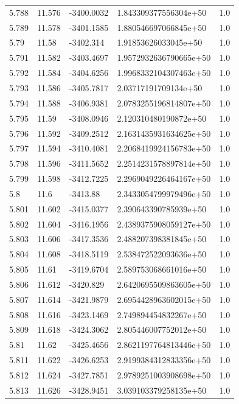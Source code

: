 \begin{tabular}{lllll}
5.788 & 11.576 & -3400.0032 & 1.843309377556304e+50 & 1.0 \\
5.789 & 11.578 & -3401.1585 & 1.880546697066845e+50 & 1.0 \\
5.79 & 11.58 & -3402.314 & 1.91853626033045e+50 & 1.0 \\
5.791 & 11.582 & -3403.4697 & 1.9572932636790665e+50 & 1.0 \\
5.792 & 11.584 & -3404.6256 & 1.9968332104307463e+50 & 1.0 \\
5.793 & 11.586 & -3405.7817 & 2.03717191709134e+50 & 1.0 \\
5.794 & 11.588 & -3406.9381 & 2.0783255196814807e+50 & 1.0 \\
5.795 & 11.59 & -3408.0946 & 2.120310480190872e+50 & 1.0 \\
5.796 & 11.592 & -3409.2512 & 2.1631435931634625e+50 & 1.0 \\
5.797 & 11.594 & -3410.4081 & 2.2068419924156783e+50 & 1.0 \\
5.798 & 11.596 & -3411.5652 & 2.2514231578897814e+50 & 1.0 \\
5.799 & 11.598 & -3412.7225 & 2.2969049226464167e+50 & 1.0 \\
5.8 & 11.6 & -3413.88 & 2.3433054799979496e+50 & 1.0 \\
5.801 & 11.602 & -3415.0377 & 2.390643390785939e+50 & 1.0 \\
5.802 & 11.604 & -3416.1956 & 2.4389375908059127e+50 & 1.0 \\
5.803 & 11.606 & -3417.3536 & 2.488207398381845e+50 & 1.0 \\
5.804 & 11.608 & -3418.5119 & 2.538472522093636e+50 & 1.0 \\
5.805 & 11.61 & -3419.6704 & 2.589753068661016e+50 & 1.0 \\
5.806 & 11.612 & -3420.829 & 2.6420695509863605e+50 & 1.0 \\
5.807 & 11.614 & -3421.9879 & 2.6954428963602015e+50 & 1.0 \\
5.808 & 11.616 & -3423.1469 & 2.749894454832267e+50 & 1.0 \\
5.809 & 11.618 & -3424.3062 & 2.805446007752012e+50 & 1.0 \\
5.81 & 11.62 & -3425.4656 & 2.8621197764813446e+50 & 1.0 \\
5.811 & 11.622 & -3426.6253 & 2.9199384312833356e+50 & 1.0 \\
5.812 & 11.624 & -3427.7851 & 2.9789251003908698e+50 & 1.0 \\
5.813 & 11.626 & -3428.9451 & 3.039103379258135e+50 & 1.0 \\

\end{tabular}
